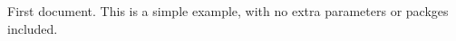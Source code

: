 \documentclass[12pt, letterpaper]{article}
\begin{document}
First document. This is a simple example, with no extra parameters or packges included.
\end{document}
